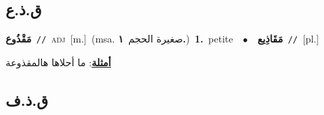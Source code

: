 \documentclass[10pt,a4paper,twoside]{article} %
\begin{document}
\begin{multicols}{2}
\vspace{-3mm}
\subsection*{\color{blue}\foreignlanguage{arabic}{ق.ذ.ع}\color{blue}{}} 

{\setlength\topsep{0pt}\textbf{\foreignlanguage{arabic}{مَقْذُوع}}\ {\color{gray}\texttt{//}\color{black}}\ \textsc{adj}\ [m.]\ \color{gray}(msa. \foreignlanguage{arabic}{صغيرة الحجم}~\foreignlanguage{arabic}{\textbf{١.}})\color{black}\ \textbf{1.}~petite\ \ $\bullet$\ \ \setlength\topsep{0pt}\textbf{\foreignlanguage{arabic}{مَقَاذِيع}}\ {\color{gray}\texttt{//}\color{black}}\ [pl.]\  \begin{flushright}\color{gray}\foreignlanguage{arabic}{\textbf{\underline{\foreignlanguage{arabic}{أمثلة}}}: ما أحلاها هالمقذوعة}\end{flushright}\color{black}} \vspace{2mm}

\vspace{-3mm}
\subsection*{\color{blue}\foreignlanguage{arabic}{ق.ذ.ف}\color{blue}{}} 


\end{multicols}
\end{document}
